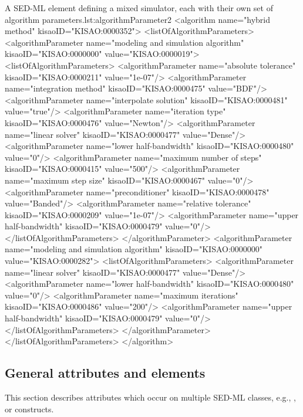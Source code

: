 \begin{myXmlLst}{A SED-ML  element defining a mixed simulator, each with their own set of algorithm parameters.}{lst:algorithmParameter2}
<algorithm name="hybrid method" kisaoID="KISAO:0000352">
    <listOfAlgorithmParameters>
        <algorithmParameter name="modeling and simulation algorithm" kisaoID="KISAO:0000000" value="KISAO:0000019">
            <listOfAlgorithmParameters>
                <algorithmParameter name="absolute tolerance"   kisaoID="KISAO:0000211" value="1e-07"/>
                <algorithmParameter name="integration method"   kisaoID="KISAO:0000475" value="BDF"/>
                <algorithmParameter name="interpolate solution" kisaoID="KISAO:0000481" value="true"/>
                <algorithmParameter name="iteration type"       kisaoID="KISAO:0000476" value="Newton"/>
                <algorithmParameter name="linear solver"        kisaoID="KISAO:0000477" value="Dense"/>
                <algorithmParameter name="lower half-bandwidth" kisaoID="KISAO:0000480" value="0"/>
                <algorithmParameter name="maximum number of steps" kisaoID="KISAO:0000415" value="500"/>
                <algorithmParameter name="maximum step size"    kisaoID="KISAO:0000467" value="0"/>
                <algorithmParameter name="preconditioner"       kisaoID="KISAO:0000478" value="Banded"/>
                <algorithmParameter name="relative tolerance"   kisaoID="KISAO:0000209" value="1e-07"/>
                <algorithmParameter name="upper half-bandwidth" kisaoID="KISAO:0000479" value="0"/>
            </listOfAlgorithmParameters>
        </algorithmParameter>
        <algorithmParameter name="modeling and simulation algorithm" kisaoID="KISAO:0000000" value="KISAO:0000282">
            <listOfAlgorithmParameters>
                <algorithmParameter name="linear solver"        kisaoID="KISAO:0000477" value="Dense"/>
                <algorithmParameter name="lower half-bandwidth" kisaoID="KISAO:0000480" value="0"/>
                <algorithmParameter name="maximum iterations"   kisaoID="KISAO:0000486" value="200"/>
                <algorithmParameter name="upper half-bandwidth" kisaoID="KISAO:0000479" value="0"/>
            </listOfAlgorithmParameters>
        </algorithmParameter>
    </listOfAlgorithmParameters>
</algorithm>
\end{myXmlLst}


\subsection{General attributes and elements}
This section describes attributes which occur on multiple SED-ML classes, e.g., \kisaoID, or \hyperref[class:listOf]{} constructs.
\label{sec:generalAttributes}

